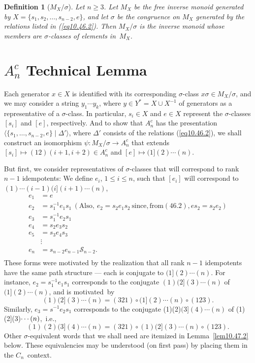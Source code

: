 \documentclass{surv-l}
\numberwithin{equation}{section}
\numberwithin{table}{section}
\numberwithin{figure}{section}
\newtheorem{definition}[equation]{Definition}
\theoremstyle{definition}
\begin{document}
\begin{definition}[$M_{X}/\sigma$]\label{defn10.46.3}
Let $n \geq 3$. Let $M_{X}$ be the free inverse monoid generated
by $X=\{s_{1}, s_{2},\ldots, s_{n-2}, e\}$, and let $\sigma$ be
the congruence on $M_{X}$ generated by the relations listed in
\emph{(\ref{eq10.46.2})}. Then $M_{X}/\sigma$ is the inverse monoid whose
members are $\sigma$-classes of elements in~$M_{X}$.
\end{definition}

\section{$A_{n}^{c}$ Technical Lemma}\label{sec10.47}

Each generator $x\in X$ is identified with its corresponding
$\sigma$-class $x\sigma\in M_{X}/\sigma$, and we may consider a
string $y_{1}\cdots y_{k}$, where $y\in Y^{\ast}=X\cup X^{-1}$ of
generators as a representative of a $\sigma$-class. In particular,
$s_{i}\in X$ and $e\in X$ represent the $\sigma$-classes $[s_{i}]$
and $[e]$, respectively. And to show that $A_{n}^{c}$ has the
presentation $\langle\{s_{1},\ldots, s_{n-2},
e\}\mid \Delta'\rangle$, where $\Delta'$ consists of
the relations (\ref{eq10.46.2}), we shall construct an isomorphism
$\psi : M_{X}/\sigma\rightarrow A_{n}^{c}$ that extends
$[s_{i}]\mapsto(12)(i+1, i+2)\in A_{n}^{c}$ and
$[e]\mapsto(1](2)\cdots(n)$.

But first, we consider representatives of $\sigma$-classes that
will correspond to rank $n-1$ idempotents: We define $e_{i}$, $1\leq
i\leq n$, such that $[e_{i}]$ will correspond to $(1)\cdots
(i-1)(i](i+1)\cdots(n)$,
\begin{equation}
\begin{split}
e_{1}&=e \\
e_{2}&=s_{1}^{-1}e_{1}s_{1}\ (\mathrm{Also,}\
e_{2}=s_{2}e_{1}s_{2}\ \mathrm{since, from (46.2)}, es_{2}=s_{2}e_{2}) \\
e_{3}&=s_{1}^{-1} e_{2}s_{1} \\
e_{4} &=s_{2}e_{3}s_{2} \label{eq10.47.1}\\
e_{5}&=s_{3}e_{4}s_{3} \\
&\vdots \\
e_{n} &=s_{n-2}e_{n-1}\mathcal{S}_{n-2}.\\
\end{split}
\end{equation}
These forms were motivated by the realization that all rank $n-1$
idempotents have the same path structure --- each is conjugate to
$(1](2)\cdots(n)$. For instance, $e_{2}=s_{1}^{-1}e_{1}s_{1}$
corresponds to the conjugate $(1)(2](3)\cdots(n)$ of
$(1](2)\cdots(n)$, and is motivated~by
\[
(1)(2](3)\cdots(n)=(321)\circ(1](2)\cdots(n)\circ (123).
\]
Similarly, $e_{3}=s^{-1}e_{2}s_{1}$ corresponds to the conjugate
(1)(2)$(3](4)\cdots(n)$ of (1)(2](3)$\cdots\break (n)$,~i.e.,
\[
(1)(2)(3](4)\cdots(n)=(321)\circ (1)(2](3)\cdots(n)\circ (123).
\]
Other $\sigma$-equivalent words that we shall need are itemized in
Lemma~\ref{lem10.47.2} below. These equivalencies may be
understood (on first pass) by placing them in the $C_{n}$~context.
\end{document}
